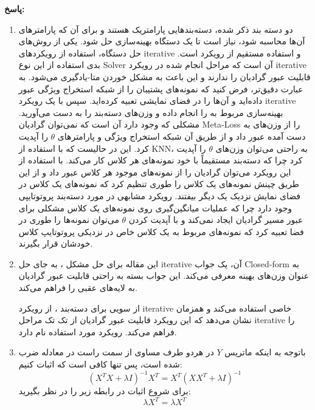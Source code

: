 \documentclass{article}
\begin{document}
\textbf{پاسخ:}

\begin{enumerate}
	\item
دو دسته بند ذکر شده، دسته‌بندهایی پارامتریک هستند و برای آن که پارامترهای آن‌ها محاسبه شود، نیاز است تا یک دستگاه بهینه‌سازی حل شود. یکی از روش‌های حل دستگاه، استفاده از رویکردهای iterative و استفاده مستقیم از رویکرد 
 است. بدی استفاده از این نوع Solver آن است که مراحل انجام شده در رویکرد iterative قابلیت عبور گرادیان را ندارند و این باعث به مشکل خوردن متا-یادگیری می‌شود. به عبارت دقیق‌تر، فرض کنید که نمونه‌های پشتیبان را از شبکه استخراج ویژگی عبور داده‌اید و آن‌ها را در فضای نمایشی تعبیه کرده‌اید. سپس با یک رویکرد iterative بهینه‌سازی مربوط به 
  را انجام داده و وزن‌های دسته‌بند را به دست می‌آورید. مشکلی که وجود دارد آن است که نمی‌توان گرادیان Meta-Loss را از وزن‌های به دست آمده عبور داد و از طریق آن شبکه استخراج ویژگی و پارامترهای 
$\theta$
را آپدیت کرد. این در حالیست که با استفاده از KNN، به راحتی می‌توان وزن‌های 
$\theta$
را آپدیت کرد چرا که دسته‌بند مستقیماً با خود نمونه‌های هر کلاس کار می‌کند. با استفاده از این رویکرد می‌توان گرادیان را از نمونه‌های موجود هر کلاس عبور داد و از این طریق چینش نمونه‌های یک کلاس را طوری تنظیم کرد که نمونه‌های یک کلاس در فضای نمایش نزدیک یک دیگر بیفتند. رویکرد مشابهی در مورد دسته‌بند پروتوتایپی وجود دارد چرا که عملیات میانگین‌گیری روی نمونه‌های یک کلاس مشکلی برای عبور مسیر گرادیان ایجاد نمی‌کند و با آپدیت کردن 
$\theta$
می‌توان نمونه‌ها را طوری در فضا تعبیه کرد که نمونه‌های مربوط به یک کلاس خاص در نزدیکی پروتوتایپ کلاس خودشان قرار بگیرند.
	\item
	این مقاله برای حل مشکل
	، به جای حل iterative آن، یک جواب Closed-form به عنوان وزن‌های بهینه معرفی می‌کند. این جواب بسته به راحتی قابلیت عبور گرادیان به لایه‌های عقبی را فراهم می‌کند.
	
	از سویی برای دسته‌بند
	 ، از رویکرد iterative خاصی استفاده می‌کند و همزمان نشان می‌دهد که این رویکرد قابلیت عبور گرادیان از تک تک مراحل iterative را فراهم می‌کند. رویکرد مورد استفاده 
	نام دارد.
	
	\item
	باتوجه به اینکه ماتریس $Y$ در هردو طرف مساوی از سمت راست در معادله ضرب شده است،‌ پس تنها کافی است که اثبات کنیم:
	$$
	{\left( {{X^T}X + \lambda I} \right)^{ - 1}}{X^T} = {X^T}{\left( {X{X^T} + \lambda I} \right)^{ - 1}}
	$$
	برای شروع اثبات در رابطه زیر را در نظر بگیرید:
	$$
	\lambda {X^T} = \lambda {X^T}
	$$
	

\end{enumerate}
\end{document}
